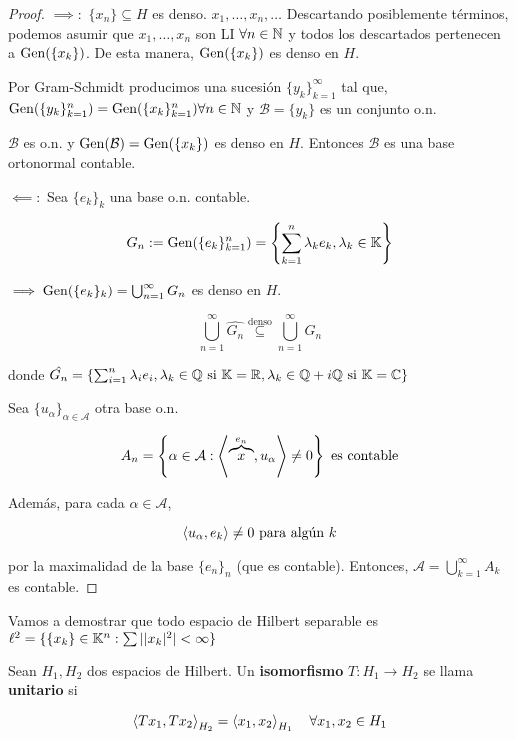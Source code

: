 \begin{proof}
    $\implies:$ $\{x_n\}\subseteq H$ es denso. $x_1,\ldots,x_n,\ldots$ Descartando posiblemente términos, podemos asumir que $x_1,\ldots,x_n$ son LI $\forall n\in\mathbb{N}$ y todos los descartados pertenecen a $\operatorname{Gen}(\{x_k\})$. De esta manera, $\operatorname{Gen}(\{x_k\})$ es denso en $H$.

    Por Gram-Schmidt producimos una sucesión $\{y_k\}_{k=1}^\infty$ tal que, $\operatorname{Gen}(\{y_k\}_{k=1}^n)=\operatorname{Gen}(\{x_k\}_{k=1}^n)\forall n\in\mathbb{N}$ y $\mathcal{B}=\{y_k\}$ es un conjunto o.n.

    $\mathcal{B}$ es o.n. y $\operatorname{Gen}(\mathcal{B})=\operatorname{Gen}(\{x_k\})$ es denso en $H$. Entonces $\mathcal{B}$ es una base ortonormal contable.

    $\impliedby:$ Sea $\{e_k\}_k$ una base o.n. contable.

    \[G_n:=\operatorname{Gen}(\{e_k\}_{k=1}^n)=\left\{\sum_{k=1}^n \lambda_ke_k,\lambda_k\in\mathbb{K}\right\}\]

    $\implies\operatorname{Gen}(\{e_k\}_k)=\bigcup_{n=1}^\infty G_n$ es denso en $H$.

    \[\bigcup_{n=1}^\infty \hat{G_n}\overset{\text{denso}}{\subseteq} \bigcup_{n=1}^\infty G_n\]

    donde $\hat{G_n}=\{\sum_{i=1}^n \lambda_i e_i,\lambda_k\in\mathbb{Q} \text{ si }\mathbb{K}=\mathbb{R}, \lambda_k\in \mathbb{Q}+i\mathbb{Q} \text{ si } \mathbb{K}=\mathbb{C}\}$


    Sea $\{u_\alpha\}_{\alpha\in\mathcal{A}}$ otra base o.n. 

    \[A_n=\left\{\alpha\in\mathcal{A}:\left\langle \overbrace{x}^{e_n},u_\alpha\right\rangle\neq 0\right\}\text{ es contable}\]

    Además, para cada $\alpha\in\mathcal{A}$, 

    \[\left\langle u_\alpha,e_k\right\rangle\neq 0\text{ para algún }k\]

    por la maximalidad de la base $\{e_n\}_n$ (que es contable). Entonces, $\mathcal{A}=\bigcup_{k=1}^\infty A_k$ es contable.
\end{proof}

Vamos a demostrar que todo espacio de Hilbert separable es $\ell^2=\{\{x_k\}\in \mathbb{K}^n:\sum ||x_k|^2|<\infty\}$

\begin{fdefinition}
    Sean $H_1,H_2$ dos espacios de Hilbert. Un \textbf{isomorfismo} $T:H_1\to H_2$ se llama \textbf{unitario} si 

    \[\left\langle Tx_1,Tx_2\right\rangle_{H_2}=\left\langle x_1,x_2\right\rangle_{H_1}\quad\forall x_1,x_2\in H_1\]
\end{fdefinition}

